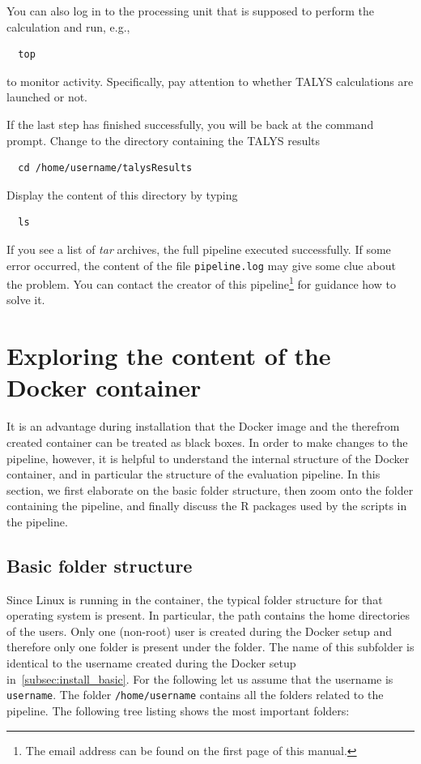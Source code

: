 \documentclass[12pt,a4paper]{scrartcl}
\begin{document}
You can also log in to the processing unit that is supposed to perform the calculation and run, e.g.,
\begin{verbatim}
  top
\end{verbatim}
to monitor activity.
Specifically, pay attention to whether TALYS calculations are launched or not.

If the last step has finished successfully, you will be back at the command prompt.
Change to the directory containing the TALYS results
\begin{verbatim}
  cd /home/username/talysResults
\end{verbatim}
Display the content of this directory by typing
\begin{verbatim}
  ls
\end{verbatim}
If you see a list of \textit{tar} archives, the full pipeline executed successfully.
If some error occurred, the content of the file \verb|pipeline.log| may give some clue about the problem.
You can contact the creator of this pipeline\footnote{The email address can be found on the first page of this manual.} for guidance how to solve it.

 \section{Exploring the content of the Docker container}
 
 It is an advantage during installation that the Docker image and the therefrom created container can be treated as black boxes.
 In order to make changes to the pipeline, however, it is helpful to understand the internal structure of the Docker container, and in particular the structure of the evaluation pipeline.
 In this section, we first elaborate on the basic folder structure, then zoom onto the folder containing the pipeline, and finally discuss the R packages used by the scripts in the pipeline.

\subsection{Basic folder structure}
Since Linux is running in the container, the typical folder structure for that operating system is present.
In particular, the path  contains the home directories of the users.
Only one (non-root) user is created during the Docker setup and therefore only one folder is present under the  folder.
The name of this subfolder is identical to the username created during the Docker setup in~\cref{subsec:install_basic}.
For the following let us assume that the username is \verb|username|.
The folder \verb|/home/username| contains all the folders related to the pipeline.
The following tree listing shows the most important folders:
\end{document}
